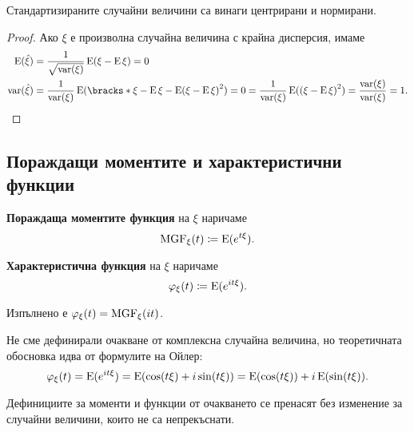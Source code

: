 \documentclass{../../common/topic}
\begin{document}
\begin{proposition}
  Стандартизираните случайни величини са винаги центрирани и нормирани.
\end{proposition}
\begin{proof}
  Ако \( \xi \) е произволна случайна величина с крайна дисперсия, имаме
  \begin{align*}
    \Expect(\hat \xi)
    &=
    \frac 1 {\sqrt{\var(\xi)}} \Expect(\xi - \Expect\xi)
    =
    0
    \\
    \var(\hat \xi)
    &=
    \frac 1 {\var(\xi)} \Expect({\bracks*{ \xi - \Expect\xi - \Expect(\xi - \Expect\xi) }}^2) = 0
    =
    \frac 1 {\var(\xi)} \Expect({(\xi - \Expect\xi)}^2)
    =
    \frac {\var(\xi)} {\var(\xi)}
    =
    1.
  \end{align*}
\end{proof}

\subsection{Пораждащи моментите и характеристични функции}

\begin{definition}
  \textbf{Пораждаща моментите функция} на \( \xi \) наричаме
  \begin{equation*}
    \operatorname{MGF}_\xi (t) \coloneqq \operatorname{E}(e^{t\xi}).
  \end{equation*}

  \textbf{Характеристична функция} на \( \xi \) наричаме
  \begin{equation*}
    \varphi_\xi (t) \coloneqq \operatorname{E}(e^{it\xi}).
  \end{equation*}

  Изпълнено е \( \varphi_\xi(t) = \operatorname{MGF}_\xi(it) \).
\end{definition}

\begin{remark}
  Не сме дефинирали очакване от комплексна случайна величина, но теоретичната обосновка идва от формулите на Ойлер:
  \begin{equation*}
    \varphi_\xi (t)
    =
    \operatorname{E}(e^{it\xi})
    =
    \operatorname{E}(\cos(t\xi) + i\sin(t\xi))
    =
    \operatorname{E}(\cos(t\xi)) + i \operatorname{E}(\sin(t\xi)).
  \end{equation*}
\end{remark}

\begin{remark}
  Дефинициите за моменти и функции от очакването се пренасят без изменение за случайни величини, които не са непрекъснати.
\end{remark}
\end{document}
